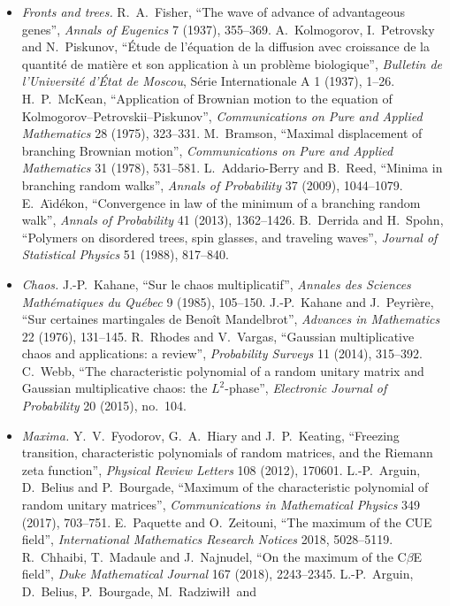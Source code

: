 \begin{itemize}
\item \emph{Fronts and trees.} R.~A.~Fisher, ``The wave of advance of advantageous genes'', \emph{Annals of Eugenics} 7 (1937), 355--369. A.~Kolmogorov, I.~Petrovsky and N.~Piskunov, ``\'Etude de l'\'equation de la diffusion avec croissance de la quantit\'e de
mati\`ere et son application \`a un probl\`eme biologique'', \emph{Bulletin de l'Universit\'e d'\'Etat de Moscou}, S\'erie Internationale A 1 (1937), 1--26. H.~P.~McKean, ``Application of Brownian motion to the equation of
Kolmogorov--Petrovskii--Piskunov'', \emph{Communications on Pure and Applied Mathematics} 28 (1975), 323--331. M.~Bramson, ``Maximal displacement of branching Brownian motion'', \emph{Communications on Pure and Applied Mathematics} 31
(1978), 531--581. L.~Addario-Berry and B.~Reed, ``Minima in branching random walks'', \emph{Annals of Probability} 37 (2009), 1044--1079. E.~A\"\i d\'ekon, ``Convergence in law of the minimum of a branching random walk'', \emph{Annals of
Probability} 41 (2013), 1362--1426. B.~Derrida and H.~Spohn, ``Polymers on disordered trees, spin glasses, and traveling waves'', \emph{Journal of Statistical Physics} 51 (1988), 817--840.
\item \emph{Chaos.} J.-P.~Kahane, ``Sur le chaos multiplicatif'', \emph{Annales des Sciences Math\'ematiques du Qu\'ebec} 9 (1985), 105--150. J.-P.~Kahane and J.~Peyri\`ere, ``Sur certaines martingales de Beno\^it Mandelbrot'', \emph{Advances in
Mathematics} 22 (1976), 131--145. R.~Rhodes and V.~Vargas, ``Gaussian multiplicative chaos and applications: a review'', \emph{Probability Surveys} 11 (2014), 315--392. C.~Webb, ``The characteristic polynomial of a random unitary matrix
and Gaussian multiplicative chaos: the $L^2$-phase'', \emph{Electronic Journal of Probability} 20 (2015), no.~104.
\item \emph{Maxima.} Y.~V.~Fyodorov, G.~A.~Hiary and J.~P.~Keating, ``Freezing transition, characteristic polynomials of random matrices, and the Riemann zeta function'', \emph{Physical Review Letters} 108 (2012), 170601. L.-P.~Arguin, D.~Belius
and P.~Bourgade, ``Maximum of the characteristic polynomial of random unitary matrices'', \emph{Communications in Mathematical Physics} 349 (2017), 703--751. E.~Paquette and O.~Zeitouni, ``The maximum of the CUE field'', \emph{International
Mathematics Research Notices} 2018, 5028--5119. R.~Chhaibi, T.~Madaule and J.~Najnudel, ``On the maximum of the C$\beta$E field'', \emph{Duke Mathematical Journal} 167 (2018), 2243--2345. L.-P.~Arguin, D.~Belius, P.~Bourgade, M.~Radziwi\l\l\ and

\end{itemize}
